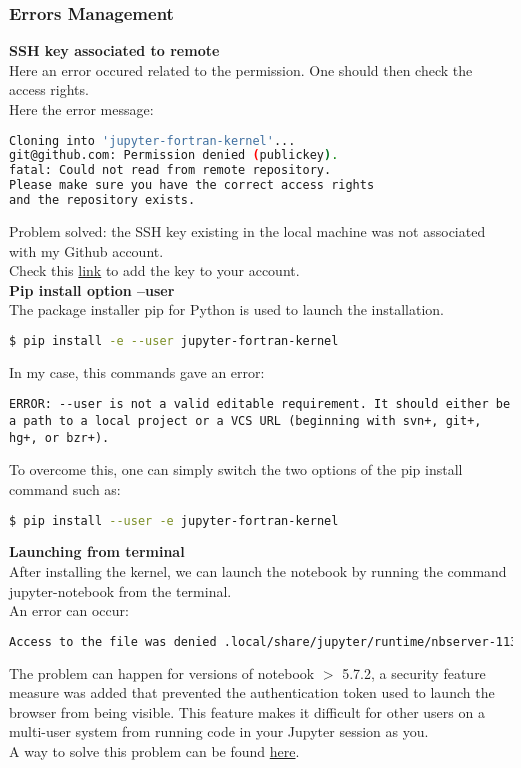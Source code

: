 \documentclass[10pt,a4paper]{article}
\begin{document}
\subsubsection{Errors Management}
\textbf{SSH key associated to remote}\\
Here an error occured related to the permission. One should then check the access rights.\\
Here the error message:\begin{lstlisting}[language=bash]
Cloning into 'jupyter-fortran-kernel'...
git@github.com: Permission denied (publickey).
fatal: Could not read from remote repository.
Please make sure you have the correct access rights
and the repository exists.
\end{lstlisting}
Problem solved: the SSH key existing in the local machine was not associated with my Github account.\\
Check this \href{https://docs.github.com/en/authentication/connecting-to-github-with-ssh/adding-a-new-ssh-key-to-your-github-account}{link} to add the key to your account.
\vspace{0.2cm}\\
\textbf{Pip install option --user}\\
The package installer pip for Python is used to launch the installation.
\begin{lstlisting}[language=bash]
$ pip install -e --user jupyter-fortran-kernel
\end{lstlisting}

\noindent In my case, this commands gave an error:
\begin{lstlisting}
ERROR: --user is not a valid editable requirement. It should either be a path to a local project or a VCS URL (beginning with svn+, git+, hg+, or bzr+).
\end{lstlisting}
To overcome this, one can simply switch the two options of the pip install command such as:
\begin{lstlisting}[language=bash]
$ pip install --user -e jupyter-fortran-kernel
\end{lstlisting}
\vspace{0.2cm}
\textbf{Launching from terminal}\\
After installing the kernel, we can launch the notebook by running the command jupyter-notebook from the terminal.\\
An error can occur:
\begin{lstlisting}[language=bash]
Access to the file was denied .local/share/jupyter/runtime/nbserver-113142-open.html is not readable
\end{lstlisting}
The problem can happen for versions of notebook $>$ 5.7.2, a security feature measure was added that prevented the authentication token used to launch the browser from being visible. This feature makes it difficult for other users on a multi-user system from running code in your Jupyter session as you.\\
A way to solve this problem can be found \href{https://stackoverflow.com/questions/70753768/jupyter-notebook-access-to-the-file-was-denied}{here}.
\end{document}

